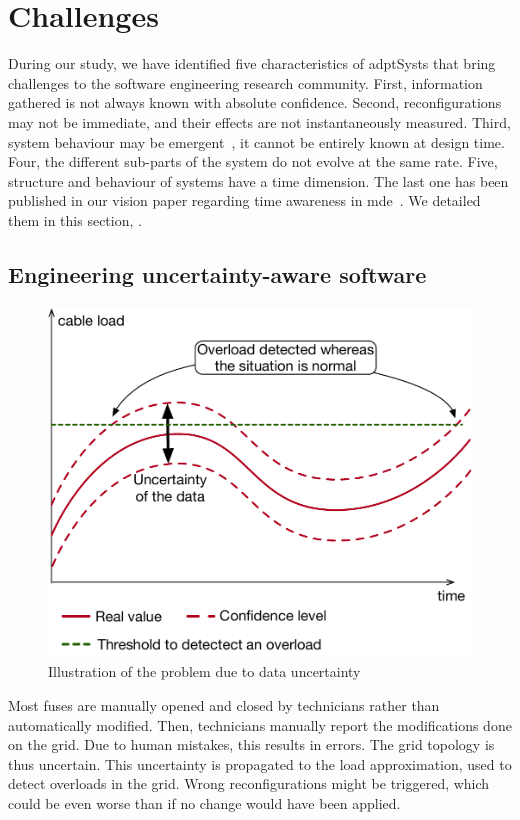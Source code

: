 \section{Challenges}

During our study, we have identified five characteristics of \glspl{adptSyst} that bring challenges to the software engineering research community.
First, information gathered is not always known with absolute confidence.
Second, reconfigurations may not be immediate, and their effects are not instantaneously measured.
Third, system behaviour may be emergent~\cite{zio2011uncertainties}, \ie it cannot be entirely known at design time.
Four, the different sub-parts of the system do not evolve at the same rate.
Five, structure and behaviour of systems have a time dimension.
The last one has been published in our vision paper regarding time awareness in \gls{mde}~\cite{DBLP:conf/models/Benelallam0MFBB17}.
We detailed them in this section, .

\subsection{Engineering uncertainty-aware software}
\label{sec:intro:challenges:duc}

\begin{figure}
	\centering
	\includegraphics[width=.6\linewidth]{img/chapt-intro/challenges/duc}
	\caption{Illustration of the problem due to data uncertainty}
	\label{fig:intro:chal:duc}
\end{figure}

Most fuses are manually opened and closed by technicians rather than automatically modified.
Then, technicians manually report the modifications done on the grid.
Due to human mistakes, this results in errors.
The grid topology is thus uncertain.
This uncertainty is propagated to the load approximation, used to detect overloads in the grid.
Wrong reconfigurations might be triggered, which could be even worse than if no change would have been applied.

